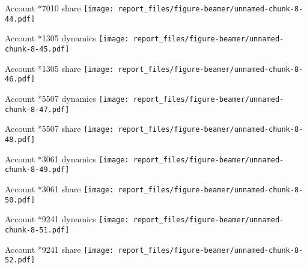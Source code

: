 \documentclass[ignorenonframetext,]{beamer}
\begin{document}
\begin{frame}{Account *7010 share
\texttt{[image: report\_files/figure-beamer/unnamed-chunk-8-44.pdf]}}
\protect\hypertarget{account-7010-share}{}

\end{frame}

\begin{frame}{Account *1305 dynamics
\texttt{[image: report\_files/figure-beamer/unnamed-chunk-8-45.pdf]}}
\protect\hypertarget{account-1305-dynamics}{}

\end{frame}

\begin{frame}{Account *1305 share
\texttt{[image: report\_files/figure-beamer/unnamed-chunk-8-46.pdf]}}
\protect\hypertarget{account-1305-share}{}

\end{frame}

\begin{frame}{Account *5507 dynamics
\texttt{[image: report\_files/figure-beamer/unnamed-chunk-8-47.pdf]}}
\protect\hypertarget{account-5507-dynamics}{}

\end{frame}

\begin{frame}{Account *5507 share
\texttt{[image: report\_files/figure-beamer/unnamed-chunk-8-48.pdf]}}
\protect\hypertarget{account-5507-share}{}

\end{frame}

\begin{frame}{Account *3061 dynamics
\texttt{[image: report\_files/figure-beamer/unnamed-chunk-8-49.pdf]}}
\protect\hypertarget{account-3061-dynamics}{}

\end{frame}

\begin{frame}{Account *3061 share
\texttt{[image: report\_files/figure-beamer/unnamed-chunk-8-50.pdf]}}
\protect\hypertarget{account-3061-share}{}

\end{frame}

\begin{frame}{Account *9241 dynamics
\texttt{[image: report\_files/figure-beamer/unnamed-chunk-8-51.pdf]}}
\protect\hypertarget{account-9241-dynamics}{}

\end{frame}

\begin{frame}{Account *9241 share
\texttt{[image: report\_files/figure-beamer/unnamed-chunk-8-52.pdf]}}
\protect\hypertarget{account-9241-share}{}

\end{frame}
\end{document}
